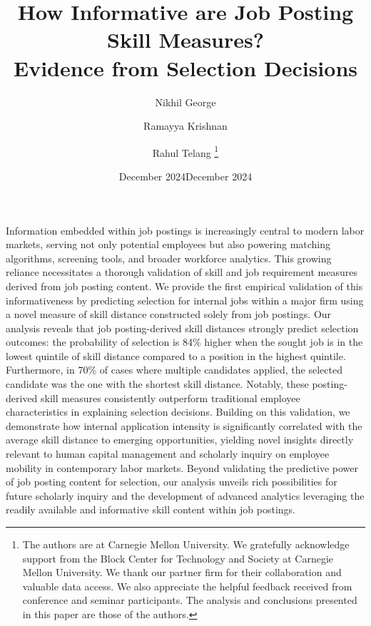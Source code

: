 \documentclass[letterpaper,11pt,leqno]{article}
\newcommand{\bib}{references.bib}
\begin{document}
\title{How Informative are Job Posting Skill Measures? \\ Evidence from Selection Decisions}

\ifanonymous
  \date{December 2024}
\else
  \author{%
    Nikhil George \and Ramayya Krishnan \and Rahul Telang%
    \thanks{The authors are at Carnegie Mellon University. We gratefully acknowledge support from the Block Center for Technology and Society at Carnegie Mellon University. We thank our partner firm for their collaboration and valuable data access. We also appreciate the helpful feedback received from conference and seminar participants. The analysis and conclusions presented in this paper are those of the authors.}%
  }
  \date{December 2024}
\fi

\begin{titlepage}
\maketitle

\maketitle

Information embedded within job postings is increasingly central to modern labor markets, serving not only potential employees but also powering 
matching algorithms, screening tools, and broader workforce analytics. This growing reliance necessitates a thorough validation of skill and job requirement 
measures derived from job posting content. We provide the first empirical validation of this informativeness by predicting selection for internal jobs within 
a major firm using a novel measure of skill distance constructed solely from job postings. Our analysis reveals that job posting-derived skill distances 
strongly predict selection outcomes: the probability of selection is 84\% higher when the sought job is in the lowest quintile of skill distance 
compared to a position in the highest quintile. Furthermore, in 70\% of cases where multiple candidates applied, the selected candidate 
was the one with the shortest skill distance. Notably, these posting-derived skill measures consistently outperform traditional employee 
characteristics in explaining selection decisions. Building on this validation, we demonstrate how internal application intensity is 
significantly correlated with the average skill distance to emerging opportunities, yielding novel insights directly relevant to 
human capital management and scholarly inquiry on employee mobility in contemporary labor markets. Beyond validating the predictive power 
of job posting content for selection, our analysis unveils rich possibilities for future scholarly inquiry and the development of 
advanced analytics leveraging the readily available and informative skill content within job postings.

\end{titlepage}










\end{document}
